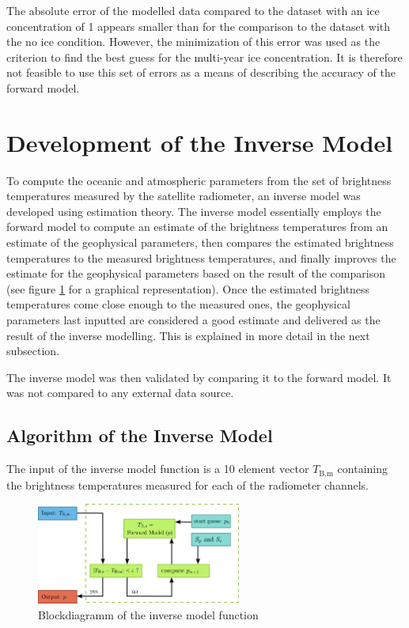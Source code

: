 \documentclass[11pt, a4paper]{article}
\begin{document}
The absolute error of the modelled data compared to the dataset with an ice concentration of 1 appears smaller than for the comparison to the dataset with the no ice condition. However, the minimization of this error was used as the criterion to find the best guess for the multi-year ice concentration. It is therefore not feasible to use this set of errors as a means of describing the accuracy of the forward model.






\clearpage
\section{Development of the Inverse Model}

To compute the oceanic and atmospheric parameters from the set of brightness temperatures measured by the satellite radiometer, an inverse model was developed using estimation theory. The inverse model essentially employs the forward model to compute an estimate of the brightness temperatures from an estimate of the geophysical parameters, then compares the estimated brightness temperatures to the measured brightness temperatures, and finally improves the estimate for the geophysical parameters based on the result of the comparison (see figure \ref{fig:block} for a graphical representation). Once the estimated brightness temperatures come close enough to the measured ones, the geophysical parameters last inputted are considered a good estimate and delivered as the result of the inverse modelling. This is explained in more detail in the next subsection.
\newline

The inverse model was then validated by comparing it to the forward model. It was not compared to any external data source.


\subsection{Algorithm of the Inverse Model}

The input of the inverse model function is a 10 element vector \(T_\text{B,m}\) containing the brightness temperatures measured for each of the radiometer channels.
\newline

\begin{figure}[h]
   \centering
   \includegraphics[width=0.6\textwidth]{blockdiagramm.pdf}
   \caption{Blockdiagramm of the inverse model function}
   \label{fig:block}
\end{figure}
\end{document}
